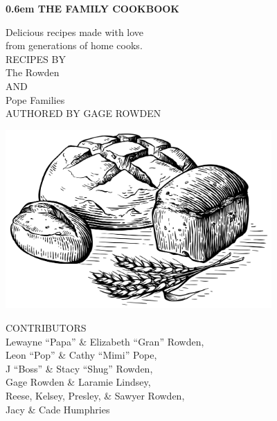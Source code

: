 \documentclass{cookbook}
\begin{document}
\clearpage
\newcommand\nbvspace[1][3]{\vspace*{\stretch{#1}}}
\newcommand{\nbtitlestretch}{\spaceskip0.6em}
\pagestyle{empty}
\begin{center}
\bfseries
\nbvspace[1]
\Huge
{\nbtitlestretch\huge
THE FAMILY COOKBOOK}

\nbvspace[1]
\normalsize

Delicious recipes made with love\\
from generations of home cooks.\\

\nbvspace[1]
\small RECIPES BY\\
\Large The Rowden\\
\medskip\small AND\\
\Large Pope Families\\
\medskip\footnotesize AUTHORED BY GAGE ROWDEN


\includegraphics[width=4in]{images/bread.jpg}
\normalsize

CONTRIBUTORS\\
\small
Lewayne ``Papa'' \& Elizabeth ``Gran'' Rowden,\\
Leon ``Pop'' \& Cathy ``Mimi'' Pope,\\
J ``Boss'' \& Stacy ``Shug'' Rowden,\\
Gage Rowden \& Laramie Lindsey,\\
Reese, Kelsey, Presley, \& Sawyer Rowden,\\
Jacy \& Cade Humphries

\nbvspace[1]
\end{center}
\end{document}
